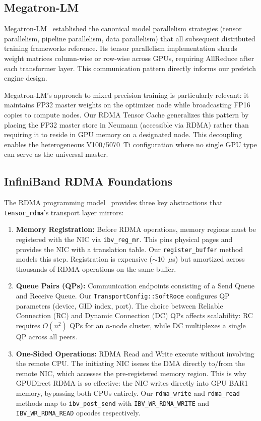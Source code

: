 \documentclass[11pt,letterpaper]{article}
\theoremstyle{definition}
\begin{document}
\subsection{Megatron-LM}

Megatron-LM~\cite{megatron2020} established the canonical model parallelism strategies (tensor parallelism, pipeline parallelism, data parallelism) that all subsequent distributed training frameworks reference. Its tensor parallelism implementation shards weight matrices column-wise or row-wise across GPUs, requiring AllReduce after each transformer layer. This communication pattern directly informs our prefetch engine design.

Megatron-LM's approach to mixed precision training is particularly relevant: it maintains FP32 master weights on the optimizer node while broadcasting FP16 copies to compute nodes. Our RDMA Tensor Cache generalizes this pattern by placing the FP32 master store in Neumann (accessible via RDMA) rather than requiring it to reside in GPU memory on a designated node. This decoupling enables the heterogeneous V100/5070~Ti configuration where no single GPU type can serve as the universal master.

\subsection{InfiniBand RDMA Foundations}

The RDMA programming model~\cite{infiniband-rdma} provides three key abstractions that \texttt{tensor\_rdma}'s transport layer mirrors:

\begin{enumerate}
    \item \textbf{Memory Registration:} Before RDMA operations, memory regions must be registered with the NIC via \texttt{ibv\_reg\_mr}. This pins physical pages and provides the NIC with a translation table. Our \texttt{register\_buffer} method models this step. Registration is expensive ($\sim$10~$\mu$s) but amortized across thousands of RDMA operations on the same buffer.

    \item \textbf{Queue Pairs (QPs):} Communication endpoints consisting of a Send Queue and Receive Queue. Our \texttt{TransportConfig::SoftRoce} configures QP parameters (device, GID index, port). The choice between Reliable Connection (RC) and Dynamic Connection (DC) QPs affects scalability: RC requires $O(n^2)$ QPs for an $n$-node cluster, while DC multiplexes a single QP across all peers.

    \item \textbf{One-Sided Operations:} RDMA Read and Write execute without involving the remote CPU. The initiating NIC issues the DMA directly to/from the remote NIC, which accesses the pre-registered memory region. This is why GPUDirect RDMA is so effective: the NIC writes directly into GPU BAR1 memory, bypassing both CPUs entirely. Our \texttt{rdma\_write} and \texttt{rdma\_read} methods map to \texttt{ibv\_post\_send} with \texttt{IBV\_WR\_RDMA\_WRITE} and \texttt{IBV\_WR\_RDMA\_READ} opcodes respectively.
\end{enumerate}
\end{document}
